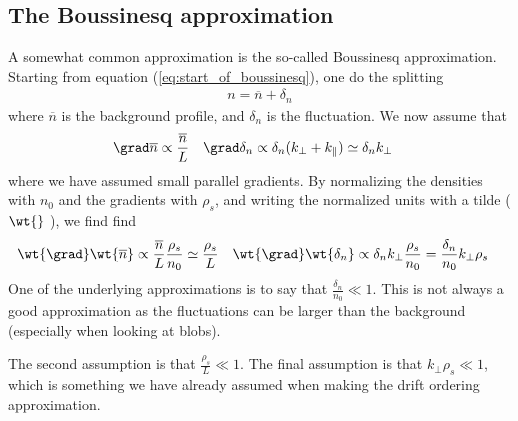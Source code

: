 \subsection{The Boussinesq approximation}
\label{sec:boussinesq}
%
A somewhat common approximation is the so-called Boussinesq approximation.
Starting from equation (\ref{eq:start_of_boussinesq}), one do the splitting
%
\begin{align*}
    n = \overline{n} + \delta_n
\end{align*}
%
where $\overline{n}$ is the background profile, and $\delta_n$ is the fluctuation.
We now assume that
%
\begin{align*}
    &\grad \overline{n} \propto \frac{\overline{n}}{L}&
    &\grad \delta_n \propto \delta_n (k_\perp + k_\|) \simeq \delta_n k_\perp&
\end{align*}
%
where we have assumed small parallel gradients.  By normalizing the densities
with $n_0$ and the gradients with $\rho_s$, and writing the normalized units
with a tilde ( $ \wt{ } $ ), we find find
%
\begin{align*}
    &\wt{\grad} \wt{\overline{n}} \propto
    \frac{\overline{n}}{L}\frac{\rho_s}{n_0}
    \simeq \frac{\rho_s}{L}
    &
    &\wt{\grad} \wt{\delta_n} \propto \delta_n k_\perp\frac{\rho_s}{n_0}
    = \frac{\delta_n}{n_0}k_\perp\rho_s
    &
\end{align*}
%
One of the underlying approximations is to say that $\frac{\delta_n}{n_0} \ll
1$. This is not always a good approximation as the fluctuations can be larger
than the background (especially when looking at
blobs).

The second assumption is that $\frac{\rho_s}{L} \ll 1$. The final assumption is
that $k_\perp\rho_s \ll 1$, which is something we have already assumed
when making the drift ordering approximation.

